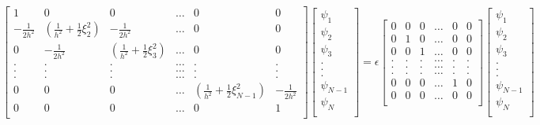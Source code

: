 \[
\begin{bmatrix}
    1       & 0 & 0 & \dots & 0 & 0 \\
    -\frac{1}{2 h^2}       & (\frac{1}{h^2} + \frac{1}{2} \xi_2^2) & -\frac{1}{2 h^2} & \dots & 0 & 0 \\
    0 & -\frac{1}{2 h^2}       & (\frac{1}{h^2} + \frac{1}{2} \xi_3^2) & \dots & 0 & 0\\
    . & . & . & \dots & . & .\\
    . & . & . & \dots & . & .\\
    . & . & . & \dots & . & .\\
    0 & 0 & 0& \dots& (\frac{1}{h^2} + \frac{1}{2} \xi_{N-1}^2) & -\frac{1}{2 h^2} \\
    0       & 0 & 0 & \dots & 0 & 1 \\
\end{bmatrix}
\begin{bmatrix}
    \psi_1 \\ 
    \psi_2 \\ 
    \psi_3 \\ 
      .\\
      .\\
      .\\
      \psi_{N-1}\\
      \psi_{N}\\
\end{bmatrix}
=
\epsilon
\begin{bmatrix}
    0       & 0 & 0 & \dots & 0 & 0 \\
    0       & 1 & 0 & \dots & 0 & 0 \\
    0       & 0 & 1 & \dots & 0 & 0 \\
    .       & . & . & \dots & . & . \\
    .       & . & . & \dots & . & . \\
    .       & . & . & \dots & . & . \\
    0       & 0 & 0 & \dots & 1 & 0 \\
    0       & 0 & 0 & \dots & 0 & 0 \\
\end{bmatrix}
\begin{bmatrix}
    \psi_1 \\ 
    \psi_2 \\ 
    \psi_3 \\ 
      .\\
      .\\
      .\\
      \psi_{N-1}\\
      \psi_{N}\\
\end{bmatrix}
\]

